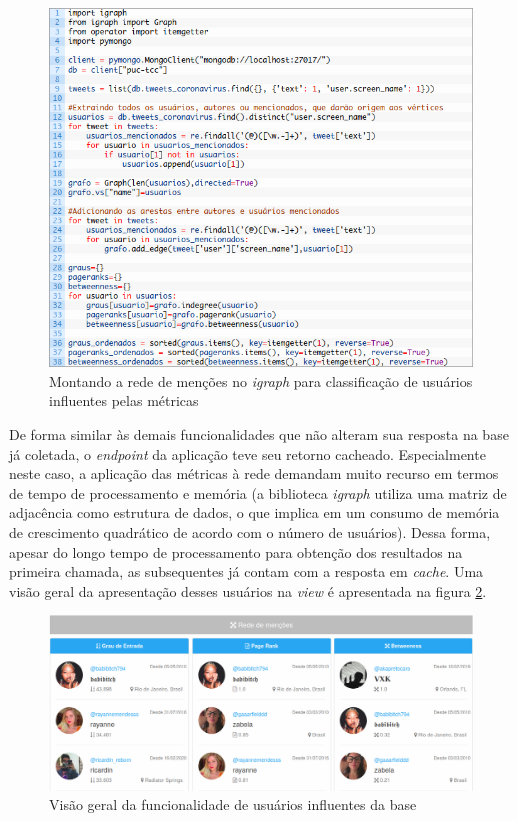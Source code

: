 \begin{figure}[!htb]
\centering
\includegraphics[width=15cm]{img/21.png}
\caption{ Montando a rede de menções no \textit{igraph} para classificação de usuários influentes pelas métricas }
\label{fig:redeigraph}
\end{figure}

De forma similar às demais funcionalidades que não alteram sua resposta na base já coletada, o \textit{endpoint} da aplicação teve seu retorno cacheado. Especialmente neste caso, a aplicação das métricas à rede demandam muito recurso em termos de tempo de processamento e memória (a biblioteca \textit{igraph} utiliza uma matriz de adjacência como estrutura de dados, o que implica em um consumo de memória de crescimento quadrático de acordo com o número de usuários). Dessa forma, apesar do longo tempo de processamento para obtenção dos resultados na primeira chamada, as subsequentes já contam com a resposta em \textit{cache}. Uma visão geral da apresentação desses usuários na \textit{view} é apresentada na figura \ref{fig:usuariosinfluentes}.

\begin{figure}[!htb]
\centering
\includegraphics[width=15cm]{img/22.png}
\caption{ Visão geral da funcionalidade de usuários influentes da base }
\label{fig:usuariosinfluentes}
\end{figure}

